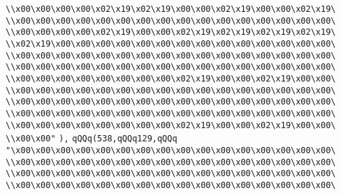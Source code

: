 \verb|\\x00\x00\x00\x00\x02\x19\x02\x19\x00\x00\x02\x19\x00\x00\x02\x19\|\newline
\verb|\\x00\x00\x00\x00\x00\x00\x00\x00\x00\x00\x00\x00\x00\x00\x00\x00\|\newline
\verb|\\x00\x00\x00\x00\x02\x19\x00\x00\x02\x19\x02\x19\x02\x19\x02\x19\|\newline
\verb|\\x02\x19\x00\x00\x00\x00\x00\x00\x00\x00\x00\x00\x00\x00\x00\x00\|\newline
\verb|\\x00\x00\x00\x00\x00\x00\x00\x00\x00\x00\x00\x00\x00\x00\x00\x00\|\newline
\verb|\\x00\x00\x00\x00\x00\x00\x00\x00\x00\x00\x00\x00\x00\x00\x00\x00\|\newline
\verb|\\x00\x00\x00\x00\x00\x00\x00\x00\x02\x19\x00\x00\x02\x19\x00\x00\|\newline
\verb|\\x00\x00\x00\x00\x00\x00\x00\x00\x00\x00\x00\x00\x00\x00\x00\x00\|\newline
\verb|\\x00\x00\x00\x00\x00\x00\x00\x00\x00\x00\x00\x00\x00\x00\x00\x00\|\newline
\verb|\\x00\x00\x00\x00\x00\x00\x00\x00\x00\x00\x00\x00\x00\x00\x00\x00\|\newline
\verb|\\x00\x00\x00\x00\x00\x00\x00\x00\x02\x19\x00\x00\x02\x19\x00\x00\|\newline
\verb|\\x00\x00"|\newline
\verb|),|\newline
\verb|qQQq(538,qQQq129,qQQq|\newline
\verb|"\x00\x00\x00\x00\x00\x00\x00\x00\x00\x00\x00\x00\x00\x00\x00\x00\|\newline
\verb|\\x00\x00\x00\x00\x00\x00\x00\x00\x00\x00\x00\x00\x00\x00\x00\x00\|\newline
\verb|\\x00\x00\x00\x00\x00\x00\x00\x00\x00\x00\x00\x00\x00\x00\x00\x00\|\newline
\verb|\\x00\x00\x00\x00\x00\x00\x00\x00\x00\x00\x00\x00\x00\x00\x00\x00\|\newline
